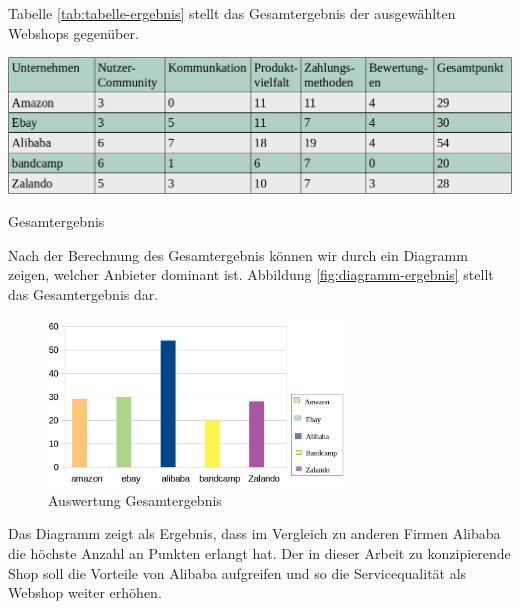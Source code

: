 Tabelle \vref{tab:tabelle-ergebnis} stellt das Gesamtergebnis der ausgewählten Webshops gegenüber.

\begin{table}[htbp]
	\centering
	\includegraphics[width=1\textwidth]{bilder/tabelle-ergebnis.png}
	\caption{Gesamtergebnis}
	\label{tab:tabelle-ergebnis}
\end{table}

Nach der Berechnung des Gesamtergebnis können wir durch ein Diagramm zeigen, welcher Anbieter dominant ist. Abbildung \vref{fig:diagramm-ergebnis} stellt das Gesamtergebnis dar.

\begin{figure}[htbp]
	\centering
	\includegraphics[width=0.7\textwidth]{bilder/diagramm-ergebnis.png}
	\caption{Auswertung Gesamtergebnis}
	\label{fig:diagramm-ergebnis}
\end{figure}

Das Diagramm zeigt als Ergebnis, dass im Vergleich zu anderen Firmen Alibaba die höchste Anzahl an Punkten erlangt hat. Der in dieser Arbeit zu konzipierende Shop soll die Vorteile von Alibaba aufgreifen und so die Servicequalität als Webshop weiter erhöhen.